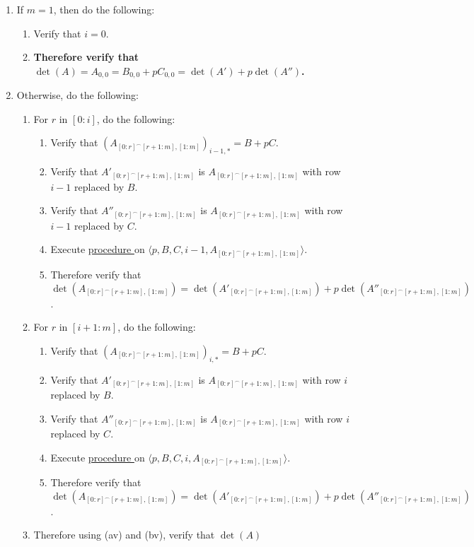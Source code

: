 \documentclass{article}
\newcounter{procedure}[part]
\newcommand{\procedurehr}[1]{\hyperref[sec:procedure #1]{procedure \expandafter\csname procedure#1\endcsname}}
\begin{document}
\begin{multicols}{2}
\begin{enumerate}
					\item If $m=1$, then do the following:
					\begin{enumerate}
						\item Verify that $i=0$.
						\item \textbf{Therefore verify that $\det(A)=A_{0,0}=B_{0,0}+pC_{0,0}=\det(A')+p\det(A'')$.}
					\end{enumerate}
					\item Otherwise, do the following:
					\begin{enumerate}
						\item For $r$ in $[0:i]$, do the following:
						\begin{enumerate}
							\item Verify that $(A_{[0:r]^\frown[r+1:m],[1:m]})_{i-1,*}=B+pC$.
							\item Verify that $A'_{[0:r]^\frown[r+1:m],[1:m]}$ is $A_{[0:r]^\frown[r+1:m],[1:m]}$ with row $i-1$ replaced by $B$.
							\item Verify that $A''_{[0:r]^\frown[r+1:m],[1:m]}$ is $A_{[0:r]^\frown[r+1:m],[1:m]}$ with row $i-1$ replaced by $C$.
							\item Execute \procedurehr{4.11} on $\langle p,B,C,i-1,A_{[0:r]^\frown[r+1:m],[1:m]}\rangle$.
							\item Therefore verify that $\det(A_{[0:r]^\frown[r+1:m],[1:m]})=\det(A'_{[0:r]^\frown[r+1:m],[1:m]})+p\det(A''_{[0:r]^\frown[r+1:m],[1:m]})$.
						\end{enumerate}
						\item For $r$ in $[i+1:m]$, do the following:
						\begin{enumerate}
							\item Verify that $(A_{[0:r]^\frown[r+1:m],[1:m]})_{i,*}=B+pC$.
							\item Verify that $A'_{[0:r]^\frown[r+1:m],[1:m]}$ is $A_{[0:r]^\frown[r+1:m],[1:m]}$ with row $i$ replaced by $B$.
							\item Verify that $A''_{[0:r]^\frown[r+1:m],[1:m]}$ is $A_{[0:r]^\frown[r+1:m],[1:m]}$ with row $i$ replaced by $C$.
							\item Execute \procedurehr{4.11} on $\langle p,B,C,i,A_{[0:r]^\frown[r+1:m],[1:m]}\rangle$.
							\item Therefore verify that $\det(A_{[0:r]^\frown[r+1:m],[1:m]})=\det(A'_{[0:r]^\frown[r+1:m],[1:m]})+p\det(A''_{[0:r]^\frown[r+1:m],[1:m]})$.
						\end{enumerate}
						\item Therefore using (av) and (bv), verify that $\det(A)$

\end{enumerate}
\end{enumerate}
\end{multicols}
\end{document}
